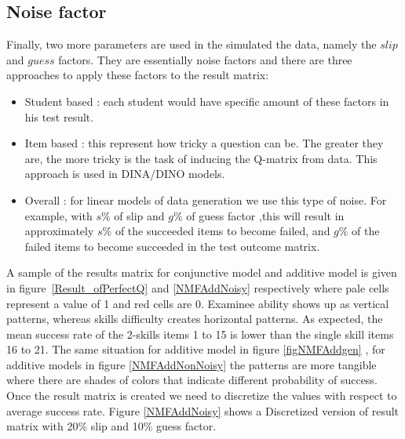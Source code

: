 \subsection{Noise factor}
\label{Noise_}
Finally, two more parameters are used in the simulated the data, namely the $\mathit{slip}$ and $\mathit{guess}$ factors. They are essentially noise factors and there are three approaches to apply these factors to the result matrix:
\begin{itemize}
\item Student based : each student would have specific amount of these factors in his test result.
\item Item based : this represent how tricky a question can be. The greater they are, the more tricky is the task of inducing the Q-matrix from data. This approach is used in DINA/DINO models.
\item Overall : for linear models of data generation we use this type of noise. For example, with $s\%$ of slip and $g\%$ of guess factor ,this will result in approximately $s\%$ of the succeeded items to become failed, and $g\%$ of the failed items to become succeeded in the test outcome matrix.

\end{itemize}

A sample of the results matrix for conjunctive model and additive model is given in figure~\ref{Result_ofPerfectQ} and  \ref{NMFAddNoisy} respectively where pale cells represent a value of 1 and red cells are 0. Examinee ability shows up as vertical patterns, whereas skills difficulty creates horizontal patterns. As expected, the mean success rate of the 2-skills items 1 to 15 is lower than the single skill items 16 to 21. The same situation for additive model in figure \ref{figNMFAddgen} , for additive models in figure  \ref{NMFAddNonNoisy} the patterns are more tangible where there are shades of colors that indicate different probability of success. Once the result matrix is created we need to discretize the values with respect to average success rate. Figure \ref{NMFAddNoisy} shows a Discretized version of result matrix with 20\% slip and 10\% guess factor.

